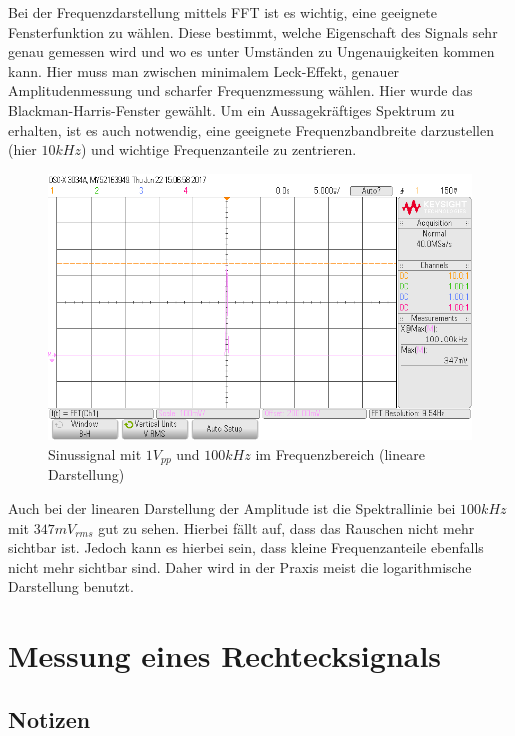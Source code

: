 \documentclass[12pt,a4paper,titlepage]{article}
\begin{document}
\noindent Bei der Frequenzdarstellung mittels FFT ist es wichtig, eine geeignete Fensterfunktion zu wählen. Diese bestimmt, welche Eigenschaft des Signals sehr genau gemessen wird und wo es unter Umständen zu Ungenauigkeiten kommen kann. Hier muss man zwischen minimalem Leck-Effekt, genauer Amplitudenmessung und scharfer Frequenzmessung wählen. Hier wurde das Blackman-Harris-Fenster gewählt. Um ein Aussagekräftiges Spektrum zu erhalten, ist es auch notwendig, eine geeignete Frequenzbandbreite darzustellen (hier $10kHz$) und wichtige Frequenzanteile zu zentrieren.

\begin{figure}[H]
  \centering
  \includegraphics[width=150mm]{scope_37.png}
  \caption{Sinussignal mit $1V_{pp}$ und $100kHz$ im Frequenzbereich (lineare Darstellung)}
\end{figure}

\noindent Auch bei der linearen Darstellung der Amplitude ist die Spektrallinie bei $100kHz$ mit $347mV_{rms}$ gut zu sehen. Hierbei fällt auf, dass das Rauschen nicht mehr sichtbar ist. Jedoch kann es hierbei sein, dass kleine Frequenzanteile ebenfalls nicht mehr sichtbar sind. Daher wird in der Praxis meist die logarithmische Darstellung benutzt.

\section{Messung eines Rechtecksignals}

\subsection*{Notizen}
\end{document}
